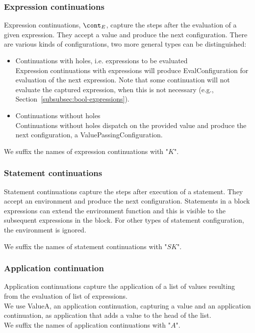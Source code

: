 \documentclass{article}
\begin{document}
\subsubsection{Expression continuations}
\label{subsubsec:expression-continuations}

Expression continuations, $\econt$, capture the steps after the evaluation of a given expression. They accept a value and produce the next configuration. 
There are various kinds of configurations, two more general types can be distinguished:
\begin{itemize}
\item Continuations with holes, i.e. expressions to be evaluated\\
Expression continuations with expressions will produce EvalConfiguration for evaluation of the next expression.
Note that some continuation will not evaluate the captured expression, when this is not necessary (e.g., Section~\ref{subsubsec:bool-expressions}).

\item Continuations without holes\\
Continuations without holes dispatch on the provided value and produce the next configuration, a ValuePassingConfiguration.
\end{itemize}
We suffix the names of expression continuations with "$K$".

\subsubsection{Statement continuations}
\label{subsubsec:statement-continuations}

Statement continuations capture the steps after execution of a statement. They accept an environment and produce the next configuration. Statements in a block expressions can extend the environment function and this is visible to the subsequent expressions in the block. For other types of statement configuration, the environment is ignored.

\noindent
We suffix the names of statement continuations with "$SK$".

\subsubsection{Application continuation}
\label{subsubsec:application-continuation}

Application continuations capture the application of a list of values resulting from the evaluation of list of expressions.\\
We use ValueA, an application continuation, capturing a value and an application continuation, as application that adds a value to the head of the list.\\
We suffix the names of application continuations with "$A$".
\end{document}
